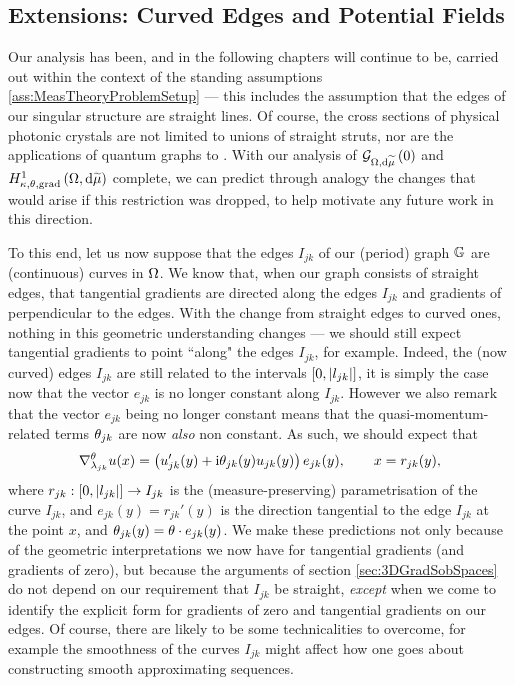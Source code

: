 \subsection{Extensions: Curved Edges and Potential Fields} \label{ssec:CurvedEdges}
Our analysis has been, and in the following chapters will continue to be, carried out within the context of the standing assumptions \ref{ass:MeasTheoryProblemSetup} --- this includes the assumption that the edges of our singular structure are straight lines.
Of course, the cross sections of physical photonic crystals are not limited to unions of straight struts, nor are the applications of quantum graphs to .
With our analysis of $\mathcal{G}_{ \Omega, \mathrm{d}\widetilde{\mu}}\left( 0 \right)$ and $H^1_{\kappa,\theta,\mathrm{grad}}\left( \Omega, \mathrm{d}\widetilde{\mu} \right)$ complete, we can predict through analogy the changes that would arise if this restriction was dropped, to help motivate any future work in this direction.

To this end, let us now suppose that the edges $I_{jk}$ of our (period) graph $\mathbb{G}$ are (continuous) curves in $\Omega$.
We know that, when our graph consists of straight edges, that tangential gradients are directed along the edges $I_{jk}$ and gradients of perpendicular to the edges.
With the change from straight edges to curved ones, nothing in this geometric understanding changes --- we should still expect tangential gradients to point ``along" the edges $I_{jk}$, for example.
Indeed, the (now curved) edges $I_{jk}$ are still related to the intervals $\left[ 0,\left\lvert l_{jk} \right\rvert \right]$, it is simply the case now that the vector $e_{jk}$ is no longer constant along $I_{jk}$.
However we also remark that the vector $e_{jk}$ being no longer constant means that the quasi-momentum-related terms $\theta_{jk}$ are now \emph{also} non constant.
As such, we should expect that
\begin{align*}
	\nabla^{\theta}_{\lambda_{jk}}u(x) = \left(  u_{jk}'(y) + \mathrm{i}\theta_{jk}(y) u_{jk}(y) \right)e_{jk}(y),
	\qquad x = r_{jk}(y),
\end{align*}
where $r_{jk}:\left[ 0,\left\lvert l_{jk} \right\rvert \right]\rightarrow I_{jk}$ is the (measure-preserving) parametrisation of the curve $I_{jk}$, and $e_{jk}(y) = r_{jk}'(y)$ is the direction tangential to the edge $I_{jk}$ at the point $x$, and $\theta_{jk}(y)=\theta\cdot e_{jk}(y)$.
We make these predictions not only because of the geometric interpretations we now have for tangential gradients (and gradients of zero), but because the arguments of section \ref{sec:3DGradSobSpaces} do not depend on our requirement that $I_{jk}$ be straight, \emph{except} when we come to identify the explicit form for gradients of zero and tangential gradients on our edges.
Of course, there are likely to be some technicalities to overcome, for example the smoothness of the curves $I_{jk}$ might affect how one goes about constructing smooth approximating sequences.

